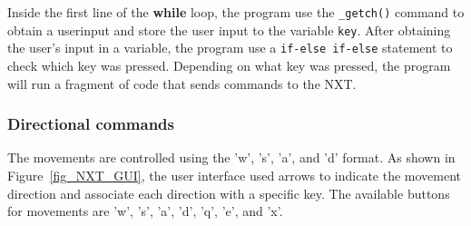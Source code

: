 \documentclass[11pt]{article}
\begin{document}
Inside the first line of the {\bf while} loop, the program use the {\tt \_getch()} 
command to obtain a userinput and store the user input to the variable {\tt key}. 
After obtaining the user's input in a variable, the program use a {\tt if-else if-else} 
statement to check which key was pressed. Depending on what key was pressed, the 
program will run a fragment of code that sends commands to the NXT.

\subsubsection*{Directional commands}
The movements are controlled using the 'w', 's', 'a', and 'd' format. As shown 
in Figure~\ref{fig_NXT_GUI}, the user interface used arrows to indicate the 
movement direction and associate each direction with a specific key. The 
available buttons for movements are 'w', 's', 'a', 'd', 'q', 'e', and 'x'.\\
\end{document}
